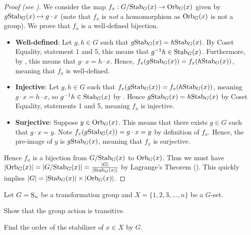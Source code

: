 \begin{proof}[Proof (see {\cite[Theorem 10.16]{humphreys_1996}})]
    We consider the map $f_x: G/\mathrm{Stab}_{G}(x) \to \mathrm{Orb}_{G}(x)$ given by $g\mathrm{Stab}_{G}(x) \mapsto g \cdot x$ (note that $f_x$ is \textit{not} a homomorphism as $\mathrm{Orb}_{G}(x)$ is not a group). We prove that $f_x$ is a well-defined bijection.
    \begin{itemize}
        \item \textbf{Well-defined}: Let $g, h \in G$ such that $g\mathrm{Stab}_{G}(x) = h\mathrm{Stab}_{G}(x)$. By Coset Equality, statement 1 and 5, this means that $g^{-1}h \in \mathrm{Stab}_{G}(x)$. Furthermore, by , this means that $g\cdot x = h\cdot x$. Hence, $f_x(g\mathrm{Stab}_{G}(x)) = f_x(h\mathrm{Stab}_{G}(x))$, meaning that $f_x$ is well-defined.
        
        \item \textbf{Injective}: Let $g, h \in G$ such that $f_x(g\mathrm{Stab}_{G}(x)) = f_x(h\mathrm{Stab}_{G}(x))$, meaning $g\cdot x = h\cdot x$, so $g^{-1}h \in \mathrm{Stab}_{G}(x)$ by . Hence $g\mathrm{Stab}_{G}(x) = h\mathrm{Stab}_{G}(x)$ by Coset Equality, statements 1 and 5, meaning $f_x$ is injective.
        
        \item \textbf{Surjective}: Suppose $y \in \mathrm{Orb}_{G}(x)$. This means that there exists $g \in G$ such that $g\cdot x = y$. Note $f_x(g\mathrm{Stab}_{G}(x)) = g\cdot x = y$ by definition of $f_x$. Hence, the pre-image of $y$ is $g\mathrm{Stab}_{G}(x)$, meaning that $f_x$ is surjective.
    \end{itemize}
    Hence $f_x$ is a bijection from $G/\mathrm{Stab}_{G}(x)$ to $\mathrm{Orb}_{G}(x)$. Thus we must have $|\mathrm{Orb}_{G}(x)| = |G/\mathrm{Stab}_{G}(x)| = \frac{|G|}{|\mathrm{Stab}_{G}(x)|}$ by Lagrange's Theorem (). This quickly implies $|G| = |\mathrm{Stab}_{G}(x)|\times|\mathrm{Orb}_{G}(x)|$.
\end{proof}

\begin{exercise}
    Let $G = \mathrm{S}_{n}$ be a transformation group and $X = \{1, 2, 3, \dots, n\}$ be a $G$-set.
    \begin{partquestions}{\roman*}
        \item Show that the group action is transitive.
        \item Find the order of the stabilizer of $x \in X$ by $G$.
    \end{partquestions}
\end{exercise}

